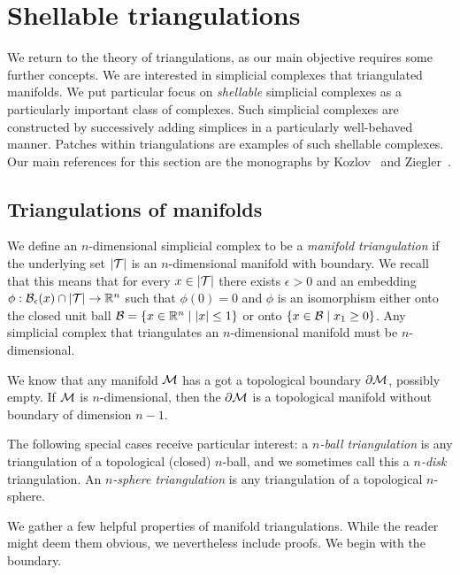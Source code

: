 \documentclass[a4paper]{article}
\begin{document}
\newpage

\section{Shellable triangulations}\label{section:advancedtriangulations}

We return to the theory of triangulations,
as our main objective requires some further concepts.
We are interested in simplicial complexes that triangulated manifolds. 
We put particular focus on \emph{shellable} simplicial complexes as a particularly important class of complexes. Such simplicial complexes are constructed by successively adding simplices in a particularly well-behaved manner. Patches within triangulations are examples of such shellable complexes. 
Our main references for this section are the monographs by Kozlov~\cite{kozlov2008combinatorial} and Ziegler~\cite{ziegler2012lectures}. 

\subsection{Triangulations of manifolds}

We define an $n$-dimensional simplicial complex to be a \emph{manifold triangulation} if the underlying set $\left| {\mathcal T} \right|$ is an $n$-dimensional manifold with boundary.
We recall that this means that for every $x \in \left| {\mathcal T} \right|$
there exists $\epsilon > 0$ and an embedding $\phi : {\mathcal B}_\epsilon(x) \cap \left| {\mathcal T} \right| \rightarrow {\mathbb R}^n$
such that $\phi(0) = 0$ and $\phi$ is an isomorphism either onto the closed unit ball $\calB = \{ x \in \bbR^n \suchthat |x| \leq 1 \}$
or onto $\{ x \in \calB \suchthat x_1 \geq 0 \}$.
Any simplicial complex that triangulates an $n$-dimensional manifold must be $n$-dimensional.

We know that any manifold ${\mathcal M}$ has a got a topological boundary $\partial{\mathcal M}$, possibly empty. 
If ${\mathcal M}$ is $n$-dimensional, then the $\partial{\mathcal M}$ is a topological manifold without boundary of dimension $n-1$. 

The following special cases receive particular interest:
a \textit{$n$-ball triangulation} is any triangulation of a topological (closed) $n$-ball,
and we sometimes call this a \textit{$n$-disk} triangulation.
An \textit{$n$-sphere triangulation} is any triangulation of a topological $n$-sphere. 

We gather a few helpful properties of manifold triangulations. 
While the reader might deem them obvious, we nevertheless include proofs. 
We begin with the boundary.
\end{document}
